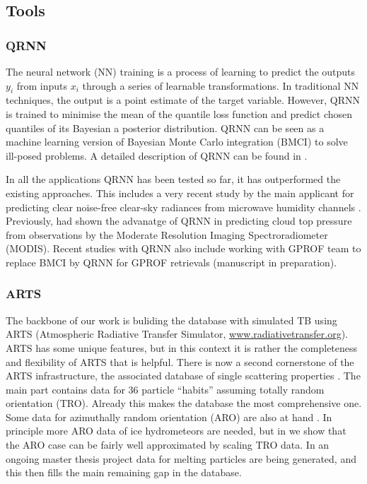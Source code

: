 \documentclass[12pt,oneside,a4paper]{article}
\begin{document}
\subsection{Tools}
\subsubsection{QRNN}
%
\label{sec:qrnn}
The neural network (NN) training is a process of learning to predict the outputs {$y_i$} from inputs {$x_i$} through a series of learnable transformations. In traditional NN techniques, the output is a point estimate of the target variable. However, QRNN is trained to minimise the mean of the quantile loss function and predict chosen quantiles of its Bayesian a posterior distribution. QRNN can be seen as a machine learning version of Bayesian Monte Carlo integration (BMCI) to solve ill-posed problems. A detailed description of QRNN can be found in \citet{pfreundschuh:aneur:18}.  

In all the applications QRNN has been tested so far, it has outperformed the existing approaches. This includes a very recent study by the main applicant for predicting clear noise-free clear-sky radiances from microwave humidity channels \citep{kaur:2021:canma}. Previously, \citet{pfreundschuh:aneur:18} had shown the advanatge of QRNN in predicting cloud top pressure from observations by the Moderate Resolution Imaging Spectroradiometer (MODIS). Recent studies with QRNN also include working with GPROF team  to replace BMCI by QRNN for GPROF retrievals (manuscript in preparation).


\subsubsection{ARTS}
\label{sec:arts}
% 
The backbone of our work is buliding the database with simulated TB using ARTS (Atmospheric Radiative Transfer Simulator, \url{www.radiativetransfer.org}). ARTS has some unique features, but in this context it is rather the completeness and flexibility of ARTS that is
helpful. There is now a second cornerstone of the ARTS infrastructure, the
associated database of single scattering properties \citep{eriksson:agene:18}.
The main part contains data for 36 particle ``habits'' assuming totally random
orientation (TRO). Already this makes the database the most comprehensive one.
Some data for azimuthally random orientation (ARO) are also at hand
\citep{brath:micro:20,ekelund:micro:20}. In principle more ARO data of ice
hydrometeors are needed, but in \citet{baralakas:intro:21} we show that the ARO
case can be fairly well approximated by scaling TRO data. In an ongoing master
thesis project data for melting particles are being generated, and this then
fills the main remaining gap in the database.
\end{document}
